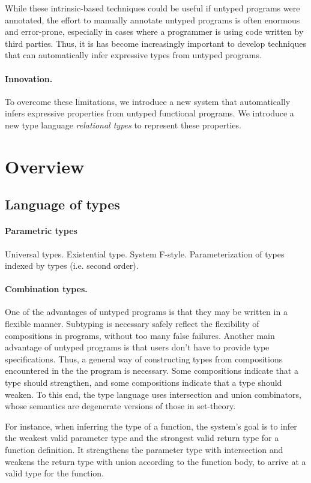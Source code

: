 \documentclass[acmsmall]{acmart}
\begin{document}
While these intrinsic-based techniques could be useful if untyped programs were annotated,
the effort to manually annotate untyped programs is often enormous and error-prone, 
especially in cases where a programmer is using code written by third parties.
Thus, it is has become increasingly important to develop techniques 
that can automatically infer expressive types from untyped programs.

\paragraph{Innovation.} 
To overcome these limitations, we introduce a new system 
that automatically infers expressive properties from untyped functional programs. 
We introduce a new type language \textit{relational types} to represent these properties.

\section{Overview}

\subsection{Language of types}

\paragraph{Parametric types}
Universal types. Existential type. System F-style. Parameterization of types indexed by types (i.e. second order).

\paragraph{Combination types.}
One of the advantages of untyped programs is that they may be written in a flexible manner.
Subtyping is necessary safely reflect the flexibility of compositions in programs, without too many false failures.
Another main advantage of untyped programs is that users don't have to provide type specifications.
Thus, a general way of constructing types from compositions encountered in the the program is necessary.
Some compositions indicate that a type should strengthen, and some compositions indicate that a type should weaken.
To this end, the type language uses intersection and union combinators, 
whose semantics are degenerate versions of those in set-theory.

For instance, when inferring the type of a function, 
the system's goal is to infer the weakest valid parameter type and the strongest valid return type for a function definition.
It strengthens the parameter type with intersection and weakens the return type with union according to the function body,
to arrive at a valid type for the function.  
\end{document}
